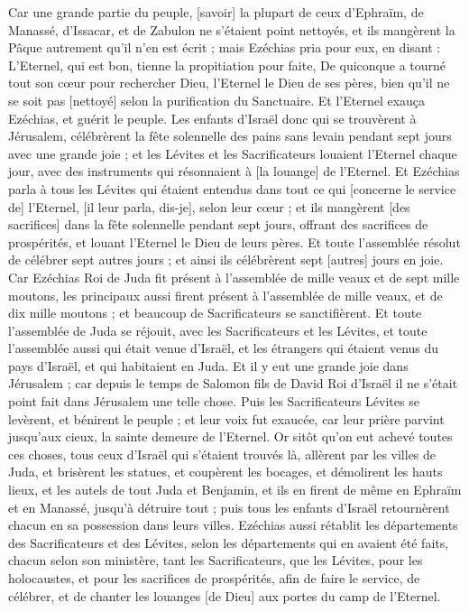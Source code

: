 \begin{multicols}{2}
Car une grande partie du peuple, [savoir] la plupart de ceux d'Ephraïm, de Manassé, d'Issacar, et de Zabulon ne s'étaient point nettoyés, et ils mangèrent la Pâque autrement qu'il n'en est écrit ; mais Ezéchias pria pour eux, en disant : L'Eternel, qui est bon, tienne la propitiation pour faite,
De quiconque a tourné tout son cœur pour rechercher Dieu, l'Eternel le Dieu de ses pères, bien qu'il ne se soit pas [nettoyé] selon la purification du Sanctuaire.
Et l'Eternel exauça Ezéchias, et guérit le peuple.
Les enfants d'Israël donc qui se trouvèrent à Jérusalem, célébrèrent la fête solennelle des pains sans levain pendant sept jours avec une grande joie ; et les Lévites et les Sacrificateurs louaient l'Eternel chaque jour, avec des instruments qui résonnaient à [la louange] de l'Eternel.
Et Ezéchias parla à tous les Lévites qui étaient entendus dans tout ce qui [concerne le service de] l'Eternel, [il leur parla, dis-je], selon leur cœur ; et ils mangèrent [des sacrifices] dans la fête solennelle pendant sept jours, offrant des sacrifices de prospérités, et louant l'Eternel le Dieu de leurs pères.
Et toute l'assemblée résolut de célébrer sept autres jours ; et ainsi ils célébrèrent sept [autres] jours en joie.
Car Ezéchias Roi de Juda fit présent à l'assemblée de mille veaux et de sept mille moutons, les principaux aussi firent présent à l'assemblée de mille veaux, et de dix mille moutons ; et beaucoup de Sacrificateurs se sanctifièrent.
Et toute l'assemblée de Juda se réjouit, avec les Sacrificateurs et les Lévites, et toute l'assemblée aussi qui était venue d'Israël, et les étrangers qui étaient venus du pays d'Israël, et qui habitaient en Juda.
Et il y eut une grande joie dans Jérusalem ; car depuis le temps de Salomon fils de David Roi d'Israël il ne s'était point fait dans Jérusalem une telle chose.
Puis les Sacrificateurs Lévites se levèrent, et bénirent le peuple ; et leur voix fut exaucée, car leur prière parvint jusqu'aux cieux, la sainte demeure de l'Eternel.
\VerseOne{}Or sitôt qu'on eut achevé toutes ces choses, tous ceux d'Israël qui s'étaient trouvés là, allèrent par les villes de Juda, et brisèrent les statues, et coupèrent les bocages, et démolirent les hauts lieux, et les autels de tout Juda et Benjamin, et ils en firent de même en Ephraïm et en Manassé, jusqu'à détruire tout ; puis tous les enfants d'Israël retournèrent chacun en sa possession dans leurs villes.
Ezéchias aussi rétablit les départements des Sacrificateurs et des Lévites, selon les départements qui en avaient été faits, chacun selon son ministère, tant les Sacrificateurs, que les Lévites, pour les holocaustes, et pour les sacrifices de prospérités, afin de faire le service, de célébrer, et de chanter les louanges [de Dieu] aux portes du camp de l'Eternel.

\end{multicols}
